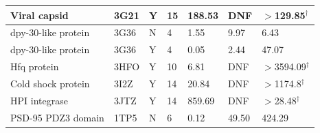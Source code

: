 \begin{table}
{\begin{tabular}{|p{1.9in}|p{0.5in}|p{0.3in}|p{0.6in}|p{0.75in}|p{0.75in}|p{0.75in}|}
Viral capsid 	&	3G21	&	Y	&	15	&	188.53	&	DNF	&	$>$129.85$^\dagger$	\\ \hline
dpy-30-like protein 	&	3G36	&	N	&	4	&	1.55	&	9.97	&	6.43	\\ \hline
dpy-30-like protein 	&	3G36	&	Y	&	4	&	0.05	&	2.44	&	47.07	\\ \hline
Hfq protein 	&	3HFO	&	Y	&	10	&	6.81	&	DNF	&	$>$3594.09$^\dagger$	\\ \hline
Cold shock protein 	&	3I2Z	&	Y	&	14	&	20.84	&	DNF	&	$>$1174.8$^\dagger$	\\ \hline
HPI integrase	&	3JTZ	&	Y	&	14	&	859.69	&	DNF	&	$>$28.48$^\dagger$	\\ \hline
PSD-95 PDZ3 domain	&	1TP5	&	N	&	6	&	0.12	&	49.50	&	424.29	\\ \hline
\end{tabular}
}
\end{table}
